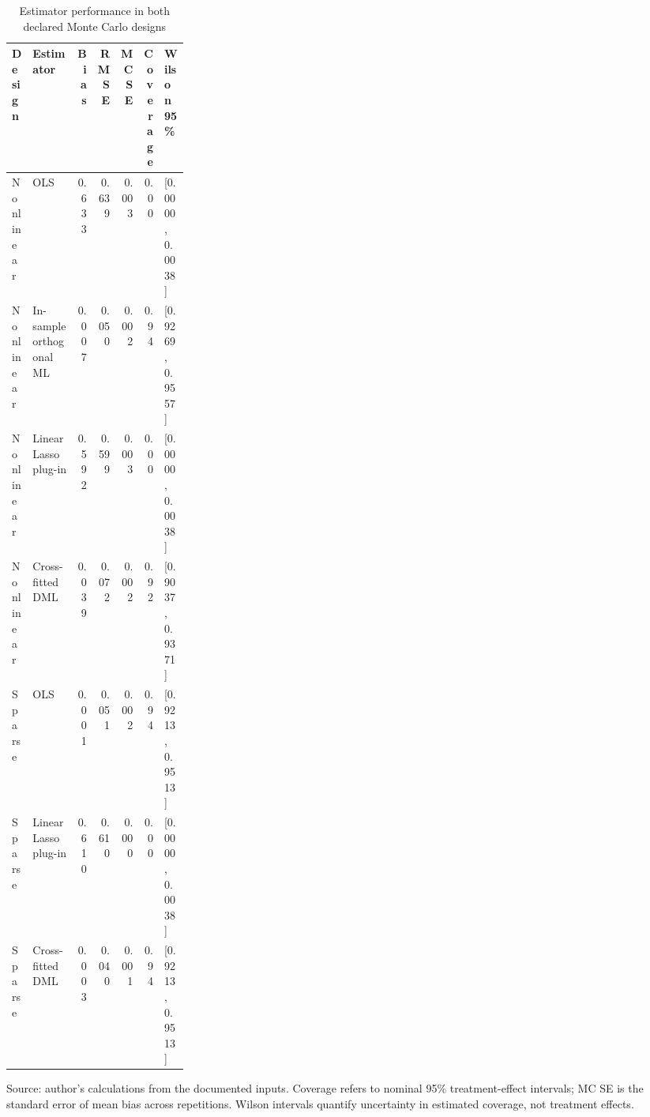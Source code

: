 \begin{table}[htbp]
\centering
\footnotesize
\caption{Estimator performance in both declared Monte Carlo designs}
\begin{tabularx}{\linewidth}{lp{0.26\linewidth}rrrrX}
\toprule
Design & Estimator & Bias & RMSE & MC SE & Coverage & Wilson 95\% \\
\midrule
Nonlinear & OLS & 0.633 & 0.639 & 0.003 & 0.00 & [0.0000, 0.0038] \\
Nonlinear & In-sample orthogonal ML & 0.007 & 0.050 & 0.002 & 0.94 & [0.9269, 0.9557] \\
Nonlinear & Linear Lasso plug-in & 0.592 & 0.599 & 0.003 & 0.00 & [0.0000, 0.0038] \\
Nonlinear & Cross-fitted DML & 0.039 & 0.072 & 0.002 & 0.92 & [0.9037, 0.9371] \\
Sparse & OLS & 0.001 & 0.051 & 0.002 & 0.94 & [0.9213, 0.9513] \\
Sparse & Linear Lasso plug-in & 0.610 & 0.610 & 0.000 & 0.00 & [0.0000, 0.0038] \\
Sparse & Cross-fitted DML & 0.003 & 0.040 & 0.001 & 0.94 & [0.9213, 0.9513] \\
\bottomrule
\end{tabularx}
\par\vspace{3pt}\begin{minipage}{\linewidth}\footnotesize Source: author's calculations from the documented inputs.\allowbreak{} Coverage refers to nominal 95\% treatment-effect intervals; MC SE is the standard error of mean bias across repetitions.\allowbreak{} Wilson intervals quantify uncertainty in estimated coverage, not treatment effects.\allowbreak{}\end{minipage}
\end{table}
